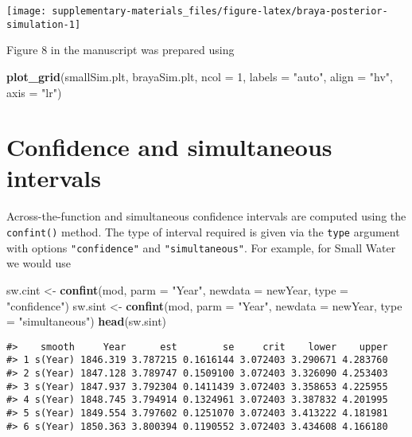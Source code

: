 \documentclass[12pt,]{article}
\newenvironment{Shaded}{\begin{snugshade}}{\end{snugshade}}
\newcommand{\KeywordTok}[1]{\textcolor[rgb]{0.13,0.29,0.53}{\textbf{{#1}}}}
\newcommand{\DataTypeTok}[1]{\textcolor[rgb]{0.13,0.29,0.53}{{#1}}}
\newcommand{\DecValTok}[1]{\textcolor[rgb]{0.00,0.00,0.81}{{#1}}}
\newcommand{\StringTok}[1]{\textcolor[rgb]{0.31,0.60,0.02}{{#1}}}
\newcommand{\NormalTok}[1]{{#1}}
\begin{document}
\begin{center}\texttt{[image: supplementary-materials\_files/figure-latex/braya-posterior-simulation-1]} \end{center}

Figure 8 in the manuscript was prepared using

\begin{Shaded}
\begin{Highlighting}[]
\KeywordTok{plot_grid}\NormalTok{(smallSim.plt, brayaSim.plt, }\DataTypeTok{ncol =} \DecValTok{1}\NormalTok{, }\DataTypeTok{labels =} \StringTok{"auto"}\NormalTok{,}
          \DataTypeTok{align =} \StringTok{"hv"}\NormalTok{, }\DataTypeTok{axis =} \StringTok{"lr"}\NormalTok{)}
\end{Highlighting}
\end{Shaded}

\section{Confidence and simultaneous
intervals}\label{confidence-and-simultaneous-intervals}

Across-the-function and simultaneous confidence intervals are computed
using the \texttt{confint()} method. The type of interval required is
given via the \texttt{type} argument with options \texttt{"confidence"}
and \texttt{"simultaneous"}. For example, for Small Water we would use

\begin{Shaded}
\begin{Highlighting}[]
\NormalTok{sw.cint <-}\StringTok{ }\KeywordTok{confint}\NormalTok{(mod, }\DataTypeTok{parm =} \StringTok{"Year"}\NormalTok{, }\DataTypeTok{newdata =} \NormalTok{newYear,}
                   \DataTypeTok{type =} \StringTok{"confidence"}\NormalTok{)}
\NormalTok{sw.sint <-}\StringTok{ }\KeywordTok{confint}\NormalTok{(mod, }\DataTypeTok{parm =} \StringTok{"Year"}\NormalTok{, }\DataTypeTok{newdata =} \NormalTok{newYear,}
                   \DataTypeTok{type =} \StringTok{"simultaneous"}\NormalTok{)}
\KeywordTok{head}\NormalTok{(sw.sint)}
\end{Highlighting}
\end{Shaded}

\begin{verbatim}
#>    smooth     Year      est        se     crit    lower    upper
#> 1 s(Year) 1846.319 3.787215 0.1616144 3.072403 3.290671 4.283760
#> 2 s(Year) 1847.128 3.789747 0.1509100 3.072403 3.326090 4.253403
#> 3 s(Year) 1847.937 3.792304 0.1411439 3.072403 3.358653 4.225955
#> 4 s(Year) 1848.745 3.794914 0.1324961 3.072403 3.387832 4.201995
#> 5 s(Year) 1849.554 3.797602 0.1251070 3.072403 3.413222 4.181981
#> 6 s(Year) 1850.363 3.800394 0.1190552 3.072403 3.434608 4.166180
\end{verbatim}
\end{document}
